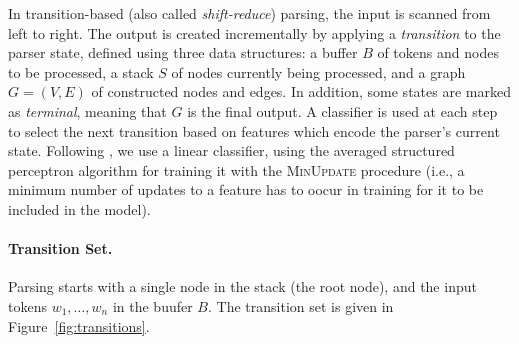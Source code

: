 \documentclass[11pt]{article}
\newcommand{\figref}[1]{Figure~\ref{#1}}
\begin{document}
In transition-based (also called \textit{shift-reduce}) parsing, the input is scanned from left to right.
The output is created incrementally by applying a \textit{transition} to the parser state,
defined using three data structures: a buffer $B$ of tokens and nodes to be processed,
a stack $S$ of nodes currently being processed,
and a graph $G=(V,E)$ of constructed nodes and edges.
In addition, some states are marked as \textit{terminal}, meaning that $G$ is the final output.
A classifier is used at each step to select the next transition based on features
which encode the parser's current state.
Following , we use a linear classifier, using
the averaged structured perceptron algorithm for training it
\cite{Coll:04} with the \textsc{MinUpdate} \cite{cai2011language} procedure
(i.e., a minimum number of updates to a feature has to oocur in training for it
to be included in the model).

\paragraph{Transition Set.}
Parsing starts with a single node in the stack (the root node), and the input tokens
$w_1, \ldots, w_n$ in the buufer $B$. The transition set is given in \figref{fig:transitions}.
\end{document}
